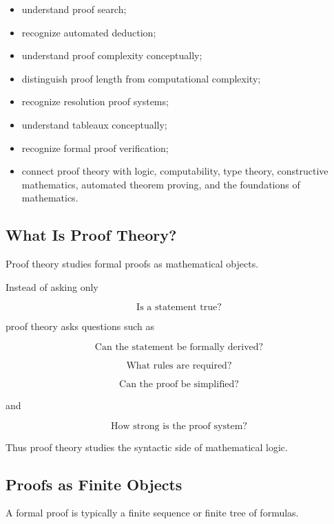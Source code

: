 {\begin{itemize}
    \item understand proof search;
    \item recognize automated deduction;
    \item understand proof complexity conceptually;
    \item distinguish proof length from computational complexity;
    \item recognize resolution proof systems;
    \item understand tableaux conceptually;
    \item recognize formal proof verification;
    \item connect proof theory with logic, computability, type theory,
          constructive mathematics, automated theorem proving, and the
          foundations of mathematics.
\end{itemize}
}

\subsection{What Is Proof Theory?}
\label{subsec:what-is-proof-theory}

Proof theory studies formal proofs as mathematical objects.

Instead of asking only

\[
\boxed{
\text{Is a statement true?}
}
\]

proof theory asks questions such as

\[
\boxed{
\text{Can the statement be formally derived?}
}
\]

\[
\boxed{
\text{What rules are required?}
}
\]

\[
\boxed{
\text{Can the proof be simplified?}
}
\]

and

\[
\boxed{
\text{How strong is the proof system?}
}
\]

Thus proof theory studies the syntactic side of mathematical logic.

\subsection{Proofs as Finite Objects}
\label{subsec:proofs-as-finite-objects}

A formal proof is typically a finite sequence or finite tree of formulas.

